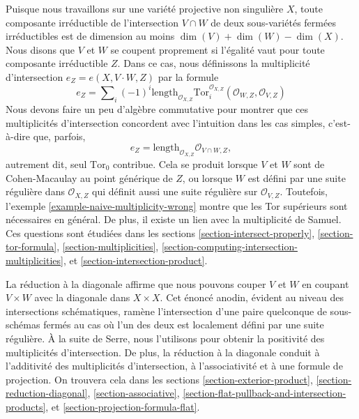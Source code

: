 \medskip\noindent
Puisque nous travaillons sur une variété projective non singulière $X$, toute composante irréductible
de l'intersection $V \cap W$ de deux sous-variétés fermées irréductibles
est de dimension au moins $\dim(V) + \dim(W) - \dim(X)$. Nous disons que $V$ et $W$
se coupent proprement si l'égalité vaut pour toute composante irréductible $Z$.
Dans ce cas, nous définissons la multiplicité d'intersection
$e_Z = e(X, V \cdot W, Z)$ par la formule
$$
e_Z = \sum\nolimits_i
(-1)^i
\text{length}_{\mathcal{O}_{X, Z}}
\text{Tor}_i^{\mathcal{O}_{X, Z}}(\mathcal{O}_{W, Z}, \mathcal{O}_{V, Z})
$$
Nous devons faire un peu d'algèbre commutative pour montrer que ces
multiplicités d'intersection concordent avec l'intuition dans les cas simples,
c'est-à-dire que, parfois,
$$
e_Z = \text{length}_{\mathcal{O}_{X, Z}} \mathcal{O}_{V \cap W, Z},
$$
autrement dit, seul $\text{Tor}_0$ contribue. Cela se produit lorsque
$V$ et $W$ sont de Cohen-Macaulay au point générique de $Z$, ou lorsque
$W$ est défini par une suite régulière dans $\mathcal{O}_{X, Z}$ qui
définit aussi une suite régulière sur $\mathcal{O}_{V, Z}$. Toutefois,
l'exemple \ref{example-naive-multiplicity-wrong} montre que les Tor supérieurs
sont nécessaires en général. De plus, il existe un lien
avec la multiplicité de Samuel. Ces questions sont étudiées dans les
sections
\ref{section-intersect-properly},
\ref{section-tor-formula},
\ref{section-multiplicities},
\ref{section-computing-intersection-multiplicities}, et
\ref{section-intersection-product}.

\medskip\noindent
La réduction à la diagonale affirme que nous pouvons couper
$V$ et $W$ en coupant $V \times W$ avec la diagonale dans $X \times X$.
Cet énoncé anodin, évident au niveau des intersections
schématiques, ramène l'intersection d'une paire quelconque
de sous-schémas fermés au cas où l'un des deux est localement défini
par une suite régulière. À la suite de Serre, nous l'utilisons pour obtenir la positivité
des multiplicités d'intersection. De plus, la réduction à la diagonale
conduit à l'additivité des multiplicités d'intersection, à l'associativité et à une
formule de projection. On trouvera cela dans les sections
\ref{section-exterior-product},
\ref{section-reduction-diagonal},
\ref{section-associative},
\ref{section-flat-pullback-and-intersection-products}, et
\ref{section-projection-formula-flat}.

